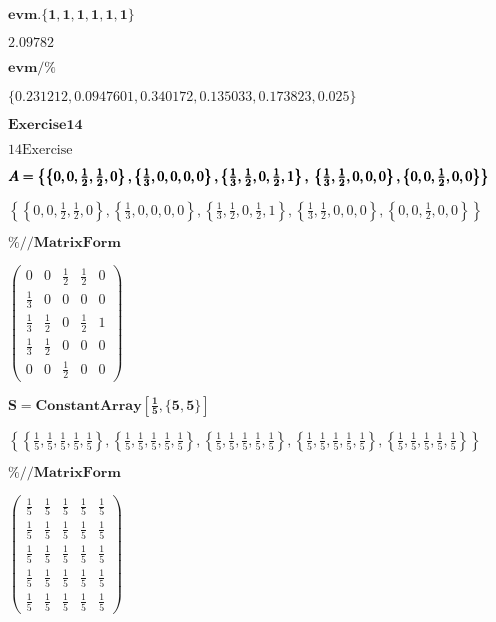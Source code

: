 \documentclass{article}
\begin{document}
\noindent\(\pmb{\text{evm}.\{1,1,1,1,1,1\}}\)

\noindent\(2.09782\)

\noindent\(\pmb{\text{evm}/\%}\)

\noindent\(\{0.231212,0.0947601,0.340172,0.135033,0.173823,0.025\}\)

\noindent\(\pmb{\text{Exercise} 14}\)

\noindent\(14 \text{Exercise}\)

\noindent\(\pmb{A=\left\{\left\{0,0,\frac{1}{2},\frac{1}{2},0\right\},\left\{\frac{1}{3},0,0,0,0\right\},\left\{\frac{1}{3},\frac{1}{2},0,\frac{1}{2},1\right\},\right.}\\
\pmb{\left.\left\{\frac{1}{3},\frac{1}{2},0,0,0\right\},\left\{0,0,\frac{1}{2},0,0\right\}\right\}}\)

\noindent\(\left\{\left\{0,0,\frac{1}{2},\frac{1}{2},0\right\},\left\{\frac{1}{3},0,0,0,0\right\},\left\{\frac{1}{3},\frac{1}{2},0,\frac{1}{2},1\right\},\left\{\frac{1}{3},\frac{1}{2},0,0,0\right\},\left\{0,0,\frac{1}{2},0,0\right\}\right\}\)

\noindent\(\pmb{\%\text{//}\text{MatrixForm}}\)

\noindent\(\left(
\begin{array}{ccccc}
 0 & 0 & \frac{1}{2} & \frac{1}{2} & 0 \\
 \frac{1}{3} & 0 & 0 & 0 & 0 \\
 \frac{1}{3} & \frac{1}{2} & 0 & \frac{1}{2} & 1 \\
 \frac{1}{3} & \frac{1}{2} & 0 & 0 & 0 \\
 0 & 0 & \frac{1}{2} & 0 & 0
\end{array}
\right)\)

\noindent\(\pmb{S=\text{ConstantArray}\left[\frac{1}{5},\{5,5\}\right]}\)

\noindent\(\left\{\left\{\frac{1}{5},\frac{1}{5},\frac{1}{5},\frac{1}{5},\frac{1}{5}\right\},\left\{\frac{1}{5},\frac{1}{5},\frac{1}{5},\frac{1}{5},\frac{1}{5}\right\},\left\{\frac{1}{5},\frac{1}{5},\frac{1}{5},\frac{1}{5},\frac{1}{5}\right\},\left\{\frac{1}{5},\frac{1}{5},\frac{1}{5},\frac{1}{5},\frac{1}{5}\right\},\left\{\frac{1}{5},\frac{1}{5},\frac{1}{5},\frac{1}{5},\frac{1}{5}\right\}\right\}\)

\noindent\(\pmb{\%\text{//}\text{MatrixForm}}\)

\noindent\(\left(
\begin{array}{ccccc}
 \frac{1}{5} & \frac{1}{5} & \frac{1}{5} & \frac{1}{5} & \frac{1}{5} \\
 \frac{1}{5} & \frac{1}{5} & \frac{1}{5} & \frac{1}{5} & \frac{1}{5} \\
 \frac{1}{5} & \frac{1}{5} & \frac{1}{5} & \frac{1}{5} & \frac{1}{5} \\
 \frac{1}{5} & \frac{1}{5} & \frac{1}{5} & \frac{1}{5} & \frac{1}{5} \\
 \frac{1}{5} & \frac{1}{5} & \frac{1}{5} & \frac{1}{5} & \frac{1}{5}
\end{array}
\right)\)
\end{document}
